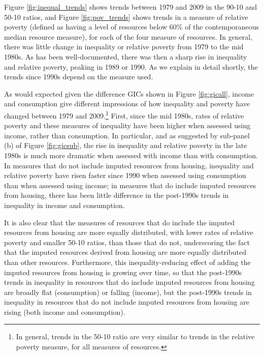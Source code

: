 
Figure \ref{fig:inequal_trends} shows trends between 1979 and 2009 in the 90-10 and 50-10 ratios, and Figure \ref{fig:pov_trends} shows trends in a measure of relative poverty (defined as having a level of resources below 60\% of the contemporaneous median resource measure), for each of the four measure of resources. In general, there was little change in inequality or relative poverty from 1979 to the mid 1980s. As has been well-documented, there was then a sharp rise in inequality and relative poverty, peaking in 1989 or 1990. As we explain in detail shortly, the trends since 1990s depend on the measure used.

As would expected given the difference GICs shown in Figure \ref{fig:gicall}, income and consumption give different impressions of how inequality and poverty have changed between 1979 and 2009.\footnote{In general, trends in the 50-10 ratio are very similar to trends in the relative poverty measure, for all measures of resources.}  First, since the mid 1980s, rates of relative poverty and these measures of inequality have been higher when assessed using income, rather than consumption. In particular, and as suggested by sub-panel (b) of Figure \ref{fig:gicsub}, the rise in inequality and relative poverty in the late 1980s is much more dramatic when assessed with income than with consumption. In measures that do not include imputed resources from housing, inequality and relative poverty have risen faster since 1990 when assessed using consumption than when assessed using income; in measures that do include imputed resources from housing, there has been little difference in the post-1990s trends in inequality in income and consumption.

It is also clear that the measures of resources that do include the imputed resources from housing are more equally distributed, with lower rates of relative poverty and smaller 50-10 ratios, than those that do not, underscoring the fact that the imputed resources derived from housing are more equally distributed than other resources. Furthermore, this inequality-reducing effect of adding the imputed resources from housing is growing over time, so that the post-1990s trends in inequality in resources that do include imputed resources from housing are broadly flat (consumption) or falling (income), but the post-1990s trends in inequality in resources that do not include imputed resources from housing are rising (both income and consumption).


